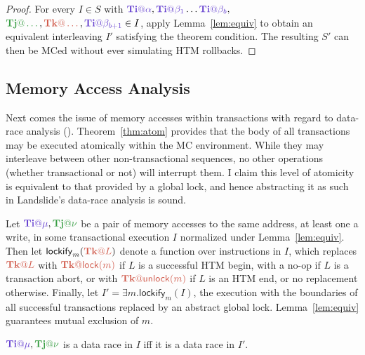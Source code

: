\begin{proof}
	For every $I \in S$ with $\tiiat{\alpha},\tiiat{\beta_1}\dots\tiiat{\beta_b},$ $\tjjat{\dots},\tkkat{\dots},\tiiat{\beta_{b+1}} \in I$,
	apply Lemma~\ref{lem:equiv} to obtain an equivalent interleaving $I'$ satisfying the theorem condition.
	The resulting $S'$ can then be MCed without ever simulating HTM rollbacks.
\end{proof}

\subsection{Memory Access Analysis}

Next comes the issue of memory accesses within transactions with regard to data-race analysis (\sect{\ref{sec:background-datarace}}).
Theorem~\ref{thm:atom} provides that the body of all transactions may be executed atomically within the MC environment.
While they may interleave between other non-transactional sequences,
no other operations (whether transactional or not) will interrupt them.
I claim this level of atomicity is equivalent to that provided by a global lock,
and hence abstracting it as such in Landslide's data-race analysis is sound.

Let $\tiiat{\mu},\tjjat{\nu}$ be a pair of memory accesses to the same address, at least one a write,
in some transactional execution $I$ normalized under Lemma~\ref{lem:equiv}.
Then let $\mathsf{lockify}_m(\tkkat{L})$ denote a function over instructions in $I$,
which replaces $\tkkat{L}$ with $\tkkat{\mathsf{lock}(m)}$ if $L$ is a successful HTM begin,
with a no-op if $L$ is a transaction abort,
or with $\tkkat{\mathsf{unlock}(m)}$ if $L$ is an HTM end,
or no replacement otherwise.
Finally, let $I' = \exists m. \mathsf{lockify}_m(I)$,
the execution with the boundaries of all successful transactions replaced by an abstract global lock.
Lemma~\ref{lem:equiv} guarantees mutual exclusion of $m$.
\vspace{1em}

\begin{theorem}
	$\tiiat{\mu},\tjjat{\nu}$ is a data race in $I$ iff it is a data race in $I'$.
\end{theorem}

